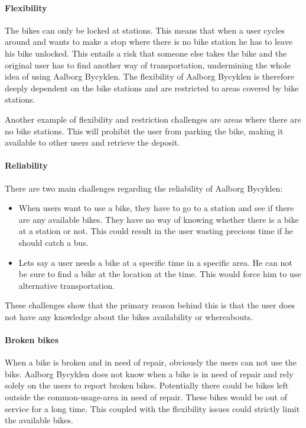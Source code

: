 \paragraph{Flexibility}
The bikes can only be locked at stations.
This means that when a user cycles around and wants to make a stop where there is no bike station he has to leave his bike unlocked.
This entails a risk that someone else takes the bike and the original user has to find another way of transportation, undermining the whole idea of using Aalborg Bycyklen.
The flexibility of Aalborg Bycyklen is therefore deeply dependent on the bike stations and are restricted to areas covered by bike stations.

Another example of flexibility and restriction challenges are areas where there are no bike stations. This will prohibit the user from parking the bike, making it available to other users and retrieve the deposit.

\paragraph{Reliability}
There are two main challenges regarding the reliability of Aalborg Bycyklen:
\begin{itemize}
\item When users want to use a bike, they have to go to a station and see if there are any available bikes.
They have no way of knowing whether there is a bike at a station or not. This could result in the user wasting precious time if he should catch a bus.
\item Lets say a user needs a bike at a specific time in a specific area.
He can not be sure to find a bike at the location at the time. This would force him to use alternative transportation.
\end{itemize}
These challenges show that the primary reason behind this is that the user does not have any knowledge about the bikes availability or whereabouts.

\paragraph{Broken bikes}
When a bike is broken and in need of repair, obviously the users can not use the bike.
Aalborg Bycyklen does not know when a bike is in need of repair and rely solely on the users to report broken bikes.
Potentially there could be bikes left outside the common-usage-area in need of repair. These bikes would be out of service for a long time.
This coupled with the flexibility issues could strictly limit the available bikes.
